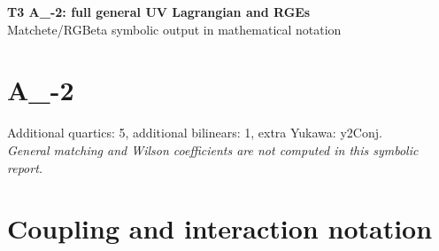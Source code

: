 \documentclass[10pt,a4paper]{article}
\begin{document}
\begin{center}
{\Large\bfseries T3 A\_-2: full general UV Lagrangian and RGEs}\\[4pt]
Matchete/RGBeta symbolic output in mathematical notation
\end{center}
\bigskip
\section*{A\_-2}
Additional quartics: 5, additional bilinears: 1, extra Yukawa: y2Conj.\\
\emph{General matching and Wilson coefficients are not computed in this symbolic report.}
\section*{Coupling and interaction notation}
\end{document}
